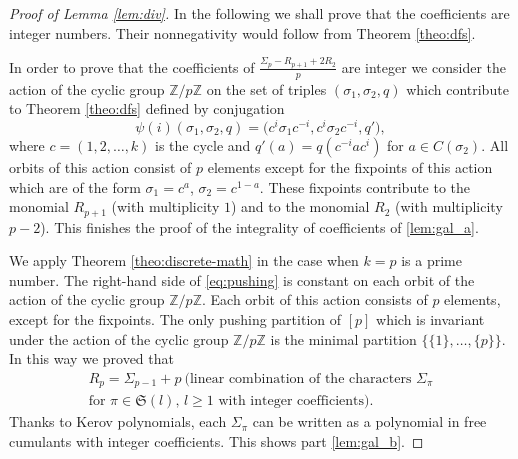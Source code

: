 \documentclass[12pt]{amsart}
\theoremstyle{plain}
\theoremstyle{remark}
\newcommand{\Sym}{\mathfrak{S}}
\newcommand{\Z}{\mathbb{Z}}
\DeclareMathOperator{\PP}{P}
\begin{document}
\begin{proof}[Proof of Lemma \ref{lem:div}]

In the following we shall prove that the coefficients are integer numbers.
Their nonnegativity would follow from Theorem \ref{theo:dfs}.

In order to prove that the coefficients of $\frac{\Sigma_{p}-R_{p+1}+2 R_2}{p}$
are integer we consider the action of the cyclic group $\mathbb{Z}/p\mathbb{Z}$
on the set of triples $(\sigma_1,\sigma_2,q)$ which contribute to Theorem
\ref{theo:dfs} defined by conjugation $$\psi(i) (\sigma_1,\sigma_2,q) = \big(
c^i \sigma_1 c^{-i}, c^i \sigma_2 c^{-i}, q'),$$ where $c=(1,2,\dots,k)$ is the
cycle and $q'(a) = q(c^{-i} a c^i)$ for $a \in C(\sigma_2)$.
All orbits
of this action consist of $p$ elements except for the fixpoints of this action
which are of the form $\sigma_1=c^a$, $\sigma_2=c^{1-a}$. These fixpoints
contribute to the monomial $R_{p+1}$ (with multiplicity $1$) and to the monomial
$R_2$ (with multiplicity $p-2$).  This finishes the proof of the integrality of
coefficients of \ref{lem:gal_a}.


We apply Theorem \ref{theo:discrete-math} in the case when $k=p$ is a prime number.
The right-hand side of \eqref{eq:pushing} is constant on each orbit of the action of the cyclic group $\Z / p \Z$. Each
orbit of this action consists of $p$ elements, except for the fixpoints. The
only
pushing partition of $[p]$ which is invariant under the action of the cyclic group $\Z / p \Z$ is the minimal partition 
$\big\{ \{1\}, \dots, \{p\} \big\}$. In this way we proved that 
\begin{multline*}  R_p = \Sigma_{p-1} + p\ \big( \text{linear combination of the characters $\Sigma_\pi$}
\\ 
\text{for $\pi\in\Sym(l)$, $l\geq 1$ with integer coefficients} \big). \end{multline*}
Thanks to Kerov polynomials, each $\Sigma_\pi$ can be written as a polynomial in free cumulants with integer
coefficients. This shows part \ref{lem:gal_b}.





\end{proof}
\end{document}
